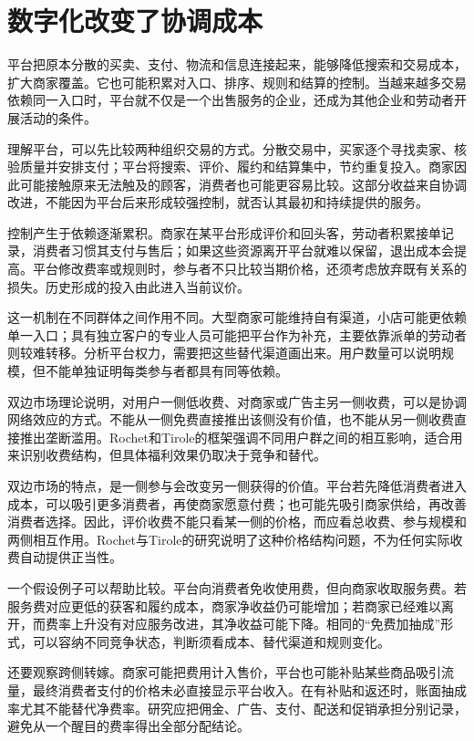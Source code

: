 \documentclass[UTF8,fontset=fandol,zihao=-4,oneside,openany]{ctexbook}
\begin{document}
\section{数字化改变了协调成本}
平台把原本分散的买卖、支付、物流和信息连接起来，能够降低搜索和交易成本，扩大商家覆盖。它也可能积累对入口、排序、规则和结算的控制。当越来越多交易依赖同一入口时，平台就不仅是一个出售服务的企业，还成为其他企业和劳动者开展活动的条件。

\label{arg:P181}
理解平台，可以先比较两种组织交易的方式。分散交易中，买家逐个寻找卖家、核验质量并安排支付；平台将搜索、评价、履约和结算集中，节约重复投入。商家因此可能接触原来无法触及的顾客，消费者也可能更容易比较。这部分收益来自协调改进，不能因为平台后来形成较强控制，就否认其最初和持续提供的服务。

控制产生于依赖逐渐累积。商家在某平台形成评价和回头客，劳动者积累接单记录，消费者习惯其支付与售后；如果这些资源离开平台就难以保留，退出成本会提高。平台修改费率或规则时，参与者不只比较当期价格，还须考虑放弃既有关系的损失。历史形成的投入由此进入当前议价。

这一机制在不同群体之间作用不同。大型商家可能维持自有渠道，小店可能更依赖单一入口；具有独立客户的专业人员可能把平台作为补充，主要依靠派单的劳动者则较难转移。分析平台权力，需要把这些替代渠道画出来。用户数量可以说明规模，但不能单独证明每类参与者都具有同等依赖。

双边市场理论说明，对用户一侧低收费、对商家或广告主另一侧收费，可以是协调网络效应的方式。不能从一侧免费直接推出该侧没有价值，也不能从另一侧收费直接推出垄断滥用。Rochet和Tirole的框架强调不同用户群之间的相互影响，适合用来识别收费结构，但具体福利效果仍取决于竞争和替代。\cite{Rochet2003}

\label{arg:P182}
双边市场的特点，是一侧参与会改变另一侧获得的价值。平台若先降低消费者进入成本，可以吸引更多消费者，再使商家愿意付费；也可能先吸引商家供给，再改善消费者选择。因此，评价收费不能只看某一侧的价格，而应看总收费、参与规模和两侧相互作用。Rochet与Tirole的研究说明了这种价格结构问题，不为任何实际收费自动提供正当性。\cite{Rochet2003}

一个假设例子可以帮助比较。平台向消费者免收使用费，但向商家收取服务费。若服务费对应更低的获客和履约成本，商家净收益仍可能增加；若商家已经难以离开，而费率上升没有对应服务改进，其净收益可能下降。相同的“免费加抽成”形式，可以容纳不同竞争状态，判断须看成本、替代渠道和规则变化。

还要观察跨侧转嫁。商家可能把费用计入售价，平台也可能补贴某些商品吸引流量，最终消费者支付的价格未必直接显示平台收入。在有补贴和返还时，账面抽成率尤其不能替代净费率。研究应把佣金、广告、支付、配送和促销承担分别记录，避免从一个醒目的费率得出全部分配结论。
\end{document}
